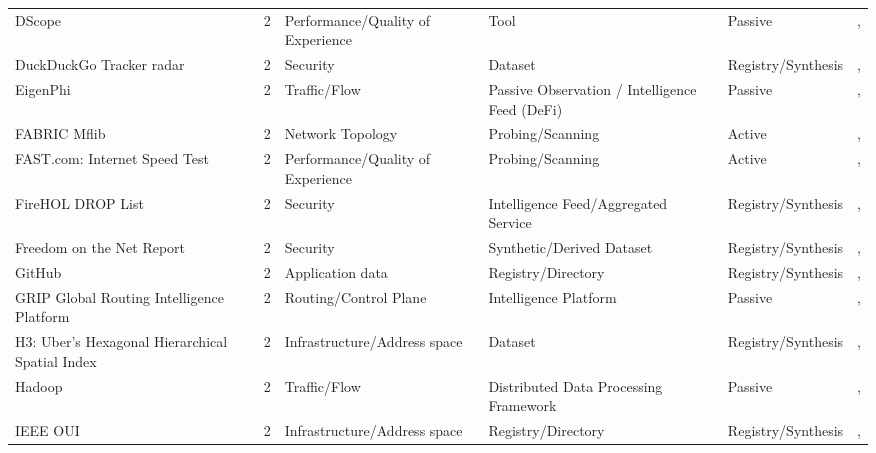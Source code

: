 \begin{table}[h!]
\begin{tabular}{lllllll}
DScope & \cite{dscope-tool} & 2 & Performance/Quality of Experience & Tool & Passive & \cite{10.1007/978-3-031-85960-1_4}, \cite{10.1145/3777912.3809148} \\
DuckDuckGo Tracker radar & \cite{ddg-tracker-radar} & 2 & Security & Dataset & Registry/Synthesis & \cite{10.1145/3618257.3624803}, \cite{10.1145/3777912.3839787} \\
EigenPhi & \cite{eigenphi} & 2 & Traffic/Flow & Passive Observation / Intelligence Feed (DeFi) & Passive & \cite{10.1145/3618257.3624824}, \cite{10.1145/3777912.3809150} \\
FABRIC Mflib & \cite{fabric_mflib} & 2 & Network Topology & Probing/Scanning & Active & \cite{10.1145/3730567.3764462}, \cite{10.1007/978-3-031-85960-1_10} \\
FAST.com: Internet Speed Test & \cite{fast_com} & 2 & Performance/Quality of Experience & Probing/Scanning & Active & \cite{10.1145/3730567.3764473}, \cite{10.1007/978-3-030-98785-5_4} \\
FireHOL DROP List & \cite{firehol_drop} & 2 & Security & Intelligence Feed/Aggregated Service & Registry/Synthesis & \cite{10.1145/3517745.3561454}, \cite{10.1007/978-3-030-72582-2_4} \\
Freedom on the Net Report & \cite{freedom_house_fotn} & 2 & Security & Synthetic/Derived Dataset & Registry/Synthesis & \cite{10.1145/3487552.3487822}, \cite{10.1007/978-3-030-98785-5_23} \\
GitHub & \cite{github} & 2 & Application data & Registry/Directory & Registry/Synthesis & \cite{10.1007/978-3-030-72582-2_5}, \cite{10.1007/978-3-030-98785-5_30} \\
GRIP Global Routing Intelligence Platform & \cite{grip_platform} & 2 & Routing/Control Plane & Intelligence Platform & Passive & \cite{10.1007/978-3-031-28486-1_15}, \cite{10.1007/978-3-032-18268-5_1} \\
H3: Uber’s Hexagonal Hierarchical Spatial Index & \cite{h3_grid} & 2 & Infrastructure/Address space & Dataset & Registry/Synthesis & \cite{10.1145/3646547.3688441}, \cite{10.1007/978-3-031-85960-1_20} \\
Hadoop & \cite{hadoop_streaming} & 2 & Traffic/Flow & Distributed Data Processing Framework & Passive & \cite{10.1145/3730567.3764459}, \cite{10.1007/978-3-032-18268-5_16} \\
IEEE OUI & \cite{ieee-oui-db} & 2 & Infrastructure/Address space & Registry/Directory & Registry/Synthesis & \cite{10.1145/3487552.3487829}, \cite{10.1007/978-3-031-56249-5_5} \\

\end{tabular}
\end{table}
